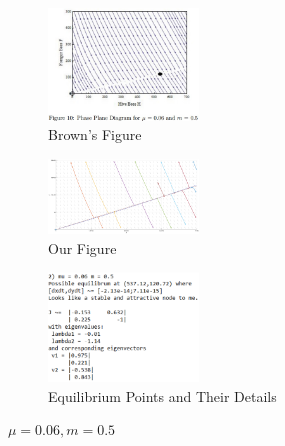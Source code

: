 \documentclass[a4paper,10pt]{article}
\begin{document}
\begin{figure}[H]
	\centering
	\begin{subfigure}[b]{0.4\textwidth}
		\centering
		\includegraphics[width=4cm]{Figure_10_2.jpg}%
		\caption{Brown's Figure\cite{Brown}}
	\end{subfigure}
	\hfill
	\begin{subfigure}[b]{0.4\textwidth}
		\centering
		\includegraphics[width=4cm]{FIgure_2_M483_Phase.png}
		\caption{Our Figure}
	\end{subfigure}
	\begin{subfigure}[b]{0.4\textwidth}
		\centering
		\includegraphics[width = 4cm]{Project_App_Info_2.png}
		\caption{Equilibrium Points and Their Details}
	\end{subfigure}
	\caption{$\mu = 0.06, m = 0.5$}
\end{figure}
\end{document}
